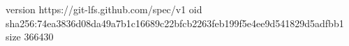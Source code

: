version https://git-lfs.github.com/spec/v1
oid sha256:74ea3836d08da49a7b1c16689c22bfcb2263feb199f5e4ee9d541829d5adfbb1
size 366430
